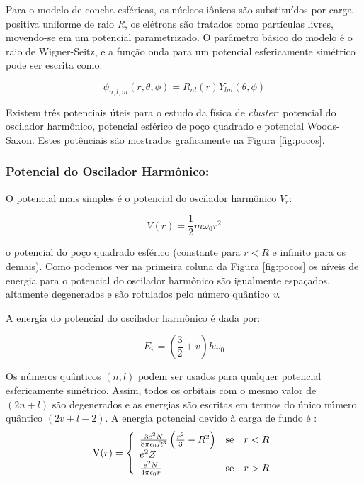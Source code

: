 


Para o modelo de concha esféricas, os núcleos iônicos são substituídos por carga positiva uniforme de raio \textit{R}, os elétrons são tratados como partículas livres, movendo-se em um potencial parametrizado. O parâmetro básico do modelo é o raio de Wigner-Seitz, e a função onda para um potencial esfericamente simétrico pode ser escrita como:

\begin{equation}
    \psi_{ n,l,m}(r, \theta, \phi) = R_{nl}(r)Y_{lm}(\theta, \phi)
\end{equation}

Existem três potenciais úteis para o estudo da física de \textit{cluster}: potencial do oscilador harmônico, potencial esférico de poço quadrado e potencial Woods-Saxon. Estes potênciais são mostrados graficamente na Figura \ref{fig:pocos}.

\subsubsection{Potencial do Oscilador Harmônico:}

O potencial mais simples é o potencial do oscilador harmônico $V_{r}$:

\begin{equation}
    V(r)= \frac{1}{2}m\omega_0r^2
\end{equation}

o potencial do poço quadrado esférico (constante para $r<R$ e infinito para os demais). Como podemos ver na primeira coluna da Figura \ref{fig:pocos} os níveis de energia para o potencial do oscilador harmônico são igualmente espaçados, altamente degenerados e são rotulados pelo número quântico \textit{v}.


A energia do potencial do oscilador harmônico é dada por:

\begin{equation}
    E_{v}= \left(\frac{3}{2}+v\right)h\omega_0
\end{equation}

Os números quânticos $(n,l)$ podem ser usados para qualquer potencial esfericamente simétrico. Assim, todos os orbitais com o mesmo valor de $(2n+l)$ são degenerados e as energias são escritas em termos do único número quântico $(2v+l-2)$. A energia potencial devido à carga de fundo é \cite{livro_cap16_Misra2012527}:
\begin{equation}
    \hbox{V}(r)
= \left\{ \begin{array}{lll}
\frac{3e^2N}{8\pi\epsilon_0R^3}\left(\frac{r^2}{3}-R^2\right) & \hbox{se} & r<R \\
e^2 Z & \hbox{} &  \\
\frac{e^2N}{4\pi\epsilon_0r} & \hbox{se} & r > R
\end{array}\right.
\end{equation}

